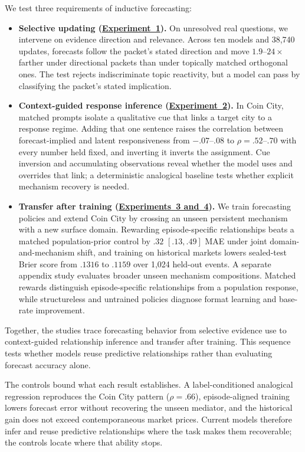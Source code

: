 We test three requirements of inductive forecasting:
\begin{itemize}[nosep,leftmargin=*]
  \item \textbf{Selective updating
  (\hyperref[sec:exp1]{Experiment~1}).} On unresolved real questions, we intervene
  on evidence direction and relevance. Across ten models and 38,740 updates,
  forecasts follow the packet's stated direction and move $1.9$--$24\times$ farther
  under directional packets than under topically matched orthogonal ones. The test
  rejects indiscriminate topic reactivity, but a model can pass by classifying the
  packet's stated implication.
  \item \textbf{Context-guided response inference
  (\hyperref[sec:exp2]{Experiment~2}).} In Coin City, matched prompts isolate a
  qualitative cue that links a target city to a response regime. Adding that one
  sentence raises the correlation between forecast-implied and latent
  responsiveness from $-.07$--$.08$ to $\rho=.52$--$.70$ with every number held
  fixed, and inverting it inverts the assignment. Cue inversion and accumulating
  observations reveal whether the model uses and overrides that link; a
  deterministic analogical baseline tests whether explicit mechanism recovery is
  needed.
  \item \textbf{Transfer after training
  (\hyperref[sec:exp3]{Experiments~3 and~4}).} We train forecasting policies and
  extend Coin City by crossing an unseen persistent mechanism with a new surface
  domain. Rewarding episode-specific relationships beats a matched population-prior
  control by $.32$ $[.13,.49]$ MAE under joint domain-and-mechanism shift, and
  training on historical markets lowers sealed-test Brier score from $.1316$ to
  $.1159$ over 1,024 held-out events. A separate appendix study evaluates broader
  unseen mechanism compositions. Matched rewards distinguish episode-specific
  relationships from a population response, while structureless and untrained
  policies diagnose format learning and base-rate improvement.
\end{itemize}

Together, the studies trace forecasting behavior from selective evidence use to
context-guided relationship inference and transfer after training. This sequence
tests whether models reuse predictive relationships rather than evaluating
forecast accuracy alone.

The controls bound what each result establishes. A label-conditioned analogical
regression reproduces the Coin City pattern ($\rho=.66$), episode-aligned training
lowers forecast error without recovering the unseen mediator, and the historical
gain does not exceed contemporaneous market prices. Current models therefore infer
and reuse predictive relationships where the task makes them recoverable; the
controls locate where that ability stops.

